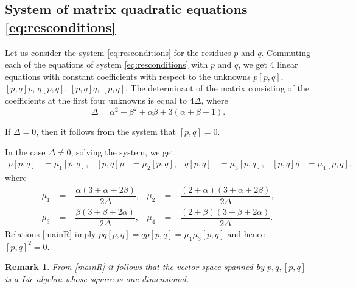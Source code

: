 \documentclass{article}
\theoremstyle{plain}
\newtheorem{remark}{Remark}
\begin{document}
\subsection{System of matrix quadratic equations \eqref{eq:resconditions}}

Let us consider the system \eqref{eq:resconditions} for the residues $p$ and $q$.
Commuting each of the equations of system \eqref{eq:resconditions} with $p$ and $q$, we get 4 linear equations with constant coefficients with respect to the unknowns $p [p,q]$, $[p,q] p$, $q [p,q]$, $[p,q] q$, $[p,q]$. The determinant of the matrix consisting of the coefficients at the first four unknowns is equal to $4 \Delta$, where 
\begin{equation*}
    \Delta 
    = \alpha^2+\beta^2+\alpha \beta + 3 (\alpha+\beta+1).
\end{equation*}

If $ \Delta=0$, then it follows from the system that $[p, q] = 0$.

In the case $\Delta\ne 0$, solving the system, we get
\begin{align}\label{mainR}
    p [p,q] 
    &= \mu_1 [p,q], 
    &
    [p,q] p 
    &= \mu_2 [p,q], 
    &
    q [p,q] 
    &= \mu_3 [p,q],
    &
    [p,q] q 
    &= \mu_4 [p,q],
\end{align}
where 
\begin{equation}\label{muu}
\begin{aligned}
    \mu_1
    &=-\dfrac{\alpha (3+\alpha+2 \beta)}{2 \Delta}, 
    &
    \mu_2
    &=-\dfrac{(2+\alpha) (3+\alpha+2 \beta)}{2 \Delta},
    \\[3mm]
    \mu_3
    &=-\dfrac{\beta (3+\beta+2 \alpha)}{2 \Delta}, 
    & 
    \mu_4
    &=-\dfrac{(2+\beta) (3+\beta+2 \alpha)}{2 \Delta}.
\end{aligned}
\end{equation}
Relations \eqref{mainR} imply $p q [p,q]=q p [p,q]=\mu_1 \mu_3 [p,q]$ and hence  $[p,q]^2=0.$  
\begin{remark} From \eqref{mainR} it follows that the vector space spanned by $p, q, [p,q]$ is a Lie algebra whose square is one-dimensional.
\end{remark}
\end{document}
